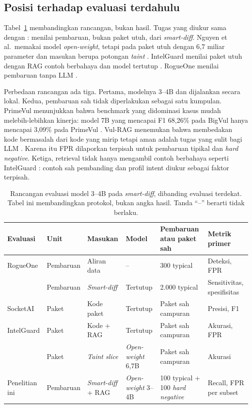 \documentclass[a4paper,fleqn]{cas-dc}
\begin{document}
\subsection{Posisi terhadap evaluasi terdahulu}

Tabel~\ref{tab:eval-protocol} membandingkan rancangan, bukan hasil. Tugas yang
diukur sama dengan \citet{wyss2025evaluating}: menilai pembaruan, bukan paket
utuh, dari \emph{smart-diff}. Nguyen et al.\ memakai model \emph{open-weight},
tetapi pada paket utuh dengan 6,7 miliar parameter dan masukan berupa potongan
\emph{taint} \citep{nguyen2025taint}. IntelGuard menilai paket utuh dengan RAG
contoh berbahaya dan model tertutup \citep{guo2026bridging}. RogueOne menilai
pembaruan tanpa LLM \citep{sofaer2024rogueone}.

Perbedaan rancangan ada tiga. Pertama, modelnya 3--4B dan dijalankan secara
lokal. Kedua, pembaruan sah tidak diperlakukan sebagai satu kumpulan.
PrimeVul menunjukkan bahwa benchmark yang didominasi kasus mudah
melebih-lebihkan kinerja: model 7B yang mencapai F1 68,26\% pada BigVul hanya
mencapai 3,09\% pada PrimeVul \citep{ding2025vulnerability}. Vul-RAG menemukan
bahwa membedakan kode bermasalah dari kode yang mirip tetapi aman adalah tugas
yang sulit bagi LLM \citep{du2026vulrag}. Karena itu FPR dilaporkan terpisah
untuk pembaruan tipikal dan \emph{hard negative}. Ketiga, retrieval tidak
hanya mengambil contoh berbahaya seperti IntelGuard
\citep{guo2026bridging}: contoh sah pembanding dan profil intent diukur
sebagai faktor terpisah.

\begin{table}[t]
\caption{Rancangan evaluasi model 3--4B pada \emph{smart-diff}, dibanding
evaluasi terdekat. Tabel ini membandingkan protokol, bukan angka hasil.
Tanda ``--'' berarti tidak berlaku.}
\label{tab:eval-protocol}
\small
\begin{tabular}{p{2.6cm} p{1.7cm} p{2.4cm} p{2.8cm} p{3.4cm} p{2.8cm}}
\hline
Evaluasi & Unit & Masukan & Model & Pembaruan atau paket sah & Metrik primer \\
\hline
RogueOne \citep{sofaer2024rogueone}
  & Pembaruan
  & Aliran data
  & --
  & 300 typical
  & Deteksi, FPR \\
\citet{wyss2025evaluating}
  & Pembaruan
  & \emph{Smart-diff}
  & Tertutup
  & 2.000 typical
  & Sensitivitas, spesifisitas \\
SocketAI \citep{zahan2025leveraging}
  & Paket
  & Kode paket
  & Tertutup
  & Paket sah campuran
  & Presisi, F1 \\
IntelGuard \citep{guo2026bridging}
  & Paket
  & Kode + RAG
  & Tertutup
  & Paket sah campuran
  & Akurasi, FPR \\
\citet{nguyen2025taint}
  & Paket
  & \emph{Taint slice}
  & \emph{Open-weight} 6,7B
  & Paket sah campuran
  & Akurasi \\
Penelitian ini
  & Pembaruan
  & \emph{Smart-diff} + RAG
  & \emph{Open-weight} 3--4B
  & 100 typical + 100 \emph{hard negative}
  & Recall, FPR per subset \\
\hline
\end{tabular}
\end{table}
\end{document}
